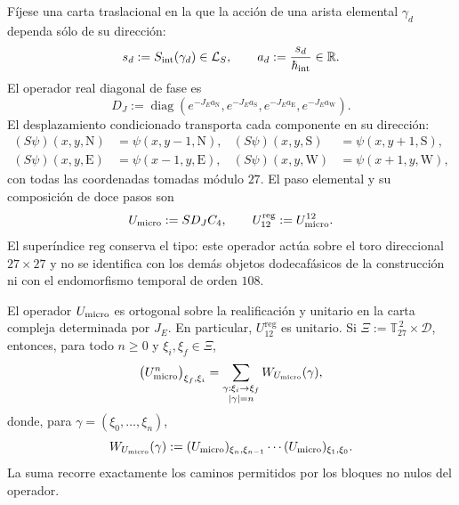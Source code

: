 Fíjese una carta traslacional en la que la acción de una arista elemental
\(\gamma_d\) dependa sólo de su dirección:
\[
 s_d:=S_{\rm int}(\gamma_d)\in\mathcal L_S,
 \qquad
 a_d:=\frac{s_d}{\hbar_{\rm int}}\in\mathbb R.
\]
El operador real diagonal de fase es
\[
 D_J:=\operatorname{diag}
 \left(
  e^{-J_Ea_{\mathrm N}},
  e^{-J_Ea_{\mathrm S}},
  e^{-J_Ea_{\mathrm E}},
  e^{-J_Ea_{\mathrm W}}
 \right).
\]
El desplazamiento condicionado transporta cada componente en su dirección:
\begin{align*}
 (S\psi)(x,y,\mathrm N)&=\psi(x,y-1,\mathrm N),&
 (S\psi)(x,y,\mathrm S)&=\psi(x,y+1,\mathrm S),\\
 (S\psi)(x,y,\mathrm E)&=\psi(x-1,y,\mathrm E),&
 (S\psi)(x,y,\mathrm W)&=\psi(x+1,y,\mathrm W),
\end{align*}
con todas las coordenadas tomadas módulo \(27\). El paso elemental y su
composición de doce pasos son
\begin{equation}
 U_{\rm micro}:=S D_J C_4,
 \qquad
 U_{12}^{\mathrm{reg}}:=U_{\rm micro}^{12}.
 \label{x_reciprocidad:eq:paso-unitario-registro-27-rev3}
\end{equation}
El superíndice \(\mathrm{reg}\) conserva el tipo: este operador actúa sobre
el toro direccional \(27\times27\) y no se identifica con los demás objetos
dodecafásicos de la construcción ni con el endomorfismo temporal de orden \(108\).

\begin{proposition}
\label{x_reciprocidad:prop:unitariedad-suma-registro-27-rev3}
El operador \(U_{\rm micro}\) es ortogonal sobre la realificación y unitario
en la carta compleja determinada por \(J_E\). En particular,
\(U_{12}^{\mathrm{reg}}\) es unitario. Si
\(\Xi:=\mathbb T_{27}^{\,2}\times\mathcal D\), entonces, para todo
\(n\geq0\) y \(\xi_i,\xi_f\in\Xi\),
\[
 \bigl(U_{\rm micro}^{n}\bigr)_{\xi_f,\xi_i}
 =
 \sum_{\substack{\gamma:\xi_i\to\xi_f\\|\gamma|=n}}
 W_{U_{\rm micro}}(\gamma),
\]
donde, para \(\gamma=(\xi_0,\ldots,\xi_n)\),
\[
 W_{U_{\rm micro}}(\gamma)
 :=
 (U_{\rm micro})_{\xi_n,\xi_{n-1}}
 \cdots
 (U_{\rm micro})_{\xi_1,\xi_0}.
\]
La suma recorre exactamente los caminos permitidos por los bloques no nulos
del operador.
\end{proposition}

